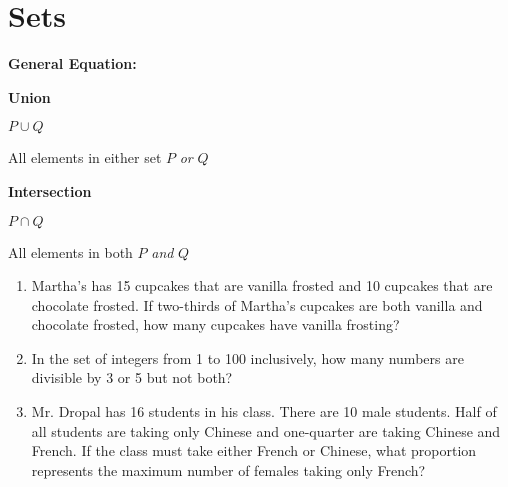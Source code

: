 \section{Sets}

\bigskip
\textbf{General Equation:}

\begin{center}
\setlength{\columnseprule}{0pt}
\begin{multicols}{2}
\textbf{\large Union}

$P\cup Q$

All elements in either set $P$ \textit{or} $Q$

\textbf{\large Intersection}

$P\cap Q$

All elements in both $P$ \textit{and} $Q$
\end{multicols}
\end{center}

\vfill
\begin{enumerate}[labelindent=*,style=multiline,leftmargin=*,label=\textbf{Example \arabic*:}]
\item Martha's has 15 cupcakes that are vanilla frosted and 10 cupcakes that are chocolate frosted. If two-thirds of Martha's cupcakes are both vanilla and chocolate frosted, how many cupcakes have vanilla frosting?
\vfill\item In the set of integers from 1 to 100 inclusively, how many numbers are divisible by 3 or 5 but not both?
\vfill\item Mr. Dropal has 16 students in his class. There are 10 male students. Half of all students are taking only Chinese and one-quarter are taking Chinese and French. If the class must take either French or Chinese, what proportion represents the maximum number of females taking only French?
\end{enumerate}

